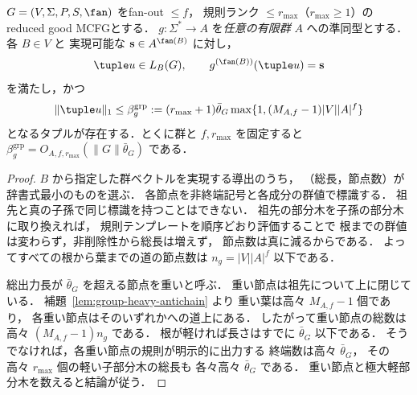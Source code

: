 \begin{theorem}[任意の有限群値を指定した短いタプル]
\label{thm:group-typed-shortest}
$G=(V,\Sigma,P,S,\fan)$ をfan-out $\le f$，
規則ランク $\le r_{\max}$（$r_{\max}\ge1$）の
reduced good MCFGとする．
$g:\Sigma^*\to A$ を\emph{任意の有限群}
$A$ への準同型とする．各 $B\in V$ と
実現可能な $\mathbf s\in A^{\fan(B)}$ に対し，
\[
 \tuple u\in L_B(G),\qquad
 g^{(\fan(B))}(\tuple u)=\mathbf s
\]
を満たし，かつ
\[
 \|\tuple u\|_1\le
 \beta_g^{\mathrm{grp}}:=
 (r_{\max}+1)\bar\theta_G
 \max\{1,(M_{A,f}-1)|V||A|^f\}
\]
となるタプルが存在する．とくに群と
$f,r_{\max}$ を固定すると
$\beta_g^{\mathrm{grp}}
=O_{A,f,r_{\max}}(\|G\|\bar\theta_G)$ である．
\end{theorem}
\begin{proof}
$B$ から指定した群ベクトルを実現する導出のうち，
（総長，節点数）が辞書式最小のものを選ぶ．
各節点を非終端記号と各成分の群値で標識する．
祖先と真の子孫で同じ標識を持つことはできない．
祖先の部分木を子孫の部分木に取り換えれば，
規則テンプレートを順序どおり評価することで
根までの群値は変わらず，非削除性から総長は増えず，
節点数は真に減るからである．
よってすべての根から葉までの道の節点数は
\(n_g=|V||A|^f\)
以下である．

総出力長が $\bar\theta_G$ を超える節点を重いと呼ぶ．
重い節点は祖先について上に閉じている．
補題~\ref{lem:group-heavy-antichain} より
重い葉は高々 $M_{A,f}-1$ 個であり，
各重い節点はそのいずれかへの道上にある．
したがって重い節点の総数は高々
$(M_{A,f}-1)n_g$ である．
根が軽ければ長さはすでに $\bar\theta_G$ 以下である．
そうでなければ，各重い節点の規則が明示的に出力する
終端数は高々 $\bar\theta_G$，
その高々 $r_{\max}$ 個の軽い子部分木の総長も
各々高々 $\bar\theta_G$ である．
重い節点と極大軽部分木を数えると結論が従う．
\end{proof}

